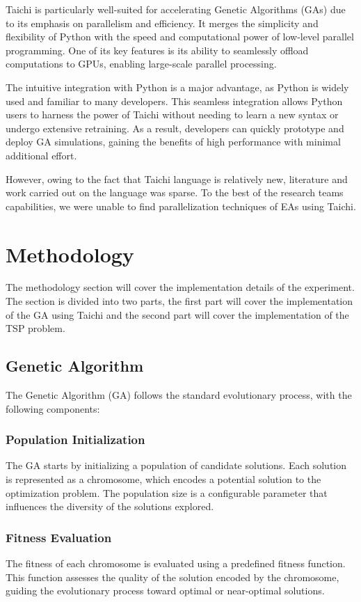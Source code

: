 \documentclass[conference]{IEEEtran}
\begin{document}
Taichi is particularly well-suited for accelerating Genetic Algorithms (GAs)
due to its emphasis on parallelism and efficiency. It merges the simplicity and
flexibility of Python with the speed and computational power of low-level
parallel programming. One of its key features is its ability to seamlessly
offload computations to GPUs, enabling large-scale parallel processing.

The intuitive integration with Python is a major advantage, as Python is widely
used and familiar to many developers. This seamless integration allows Python
users to harness the power of Taichi without needing to learn a new syntax or
undergo extensive retraining. As a result, developers can quickly prototype and
deploy GA simulations, gaining the benefits of high performance with minimal
additional effort.

However, owing to the fact that Taichi language is relatively new, literature
and work carried out on the language was sparse. To the best of the research
teams capabilities, we were unable to find parallelization techniques of EAs
using Taichi.

\section{Methodology}
The methodology section will cover the implementation details of the
experiment. The section is divided into two parts, the first part will cover
the implementation of the GA using Taichi and the second part will cover the
implementation of the TSP problem.

\subsection{Genetic Algorithm}
The Genetic Algorithm (GA) follows the standard evolutionary process, with the
following components:

\subsubsection{Population Initialization}
The GA starts by initializing a population of candidate solutions. Each
solution is represented as a chromosome, which encodes a potential solution to
the optimization problem. The population size is a configurable parameter that
influences the diversity of the solutions explored.

\subsubsection{Fitness Evaluation}
The fitness of each chromosome is evaluated using a predefined fitness
function. This function assesses the quality of the solution encoded by the
chromosome, guiding the evolutionary process toward optimal or near-optimal
solutions.
\end{document}
